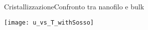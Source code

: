 \documentclass{beamer}
\begin{document}

\begin{frame}{Cristallizzazione}{Confronto tra nanofilo e bulk}
\begin{center}
 \texttt{[image: u\_vs\_T\_withSosso]}\\[0.2cm]
 {}
\end{center}
\end{frame}
\end{document}
